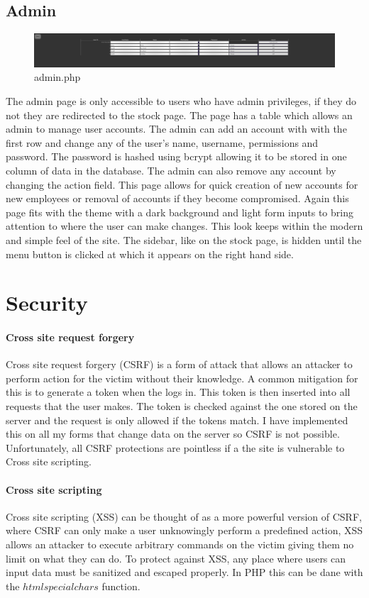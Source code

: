 \documentclass[12pt,a4paper]{report}
\begin{document}
	\subsection{Admin}
	\begin{figure}[!ht]
		\hspace*{-1in}
		\centering
		\includegraphics[width=170mm]{img/admin.png}
		\caption{admin.php \label{admin.php}}
	\end{figure}
	The admin page is only accessible to users who have admin privileges, if they do not they are redirected to the stock page. The page has a table which allows an admin to manage user accounts. The admin can add an account with with the first row and change any of the user's name, username, permissions and password. The password is hashed using bcrypt allowing it to be stored in one column of data in the database. The admin can also remove any account by changing the action field. This page allows for quick creation of new accounts for new employees or removal of accounts if they become compromised. Again this page fits with the theme with a dark background and light form inputs to bring attention to where the user can make changes. This look keeps within the modern and simple feel of the site. The sidebar, like on the stock page, is hidden until the menu button is clicked at which it appears on the right hand side.
	\newpage
	\section{Security}
	\paragraph{Cross site request forgery}
	Cross site request forgery (CSRF) is a form of attack that allows an attacker to perform action for the victim without their knowledge. A common mitigation for this is to generate a token when the logs in. This token is then inserted into all requests that the user makes. The token is checked against the one stored on the server and the request is only allowed if the tokens match. I have implemented this on all my forms that change data on the server so CSRF is not possible. Unfortunately, all CSRF protections are pointless if a the site is vulnerable to Cross site scripting.
	\paragraph{Cross site scripting}
	Cross site scripting (XSS) can be thought of as a more powerful version of CSRF, where CSRF can only make a user unknowingly perform a predefined action, XSS allows an attacker to execute arbitrary commands on the victim giving them no limit on what they can do. To protect against XSS, any place where users can input data must be sanitized and escaped properly. In PHP this can be dane with the $htmlspecialchars$ function.
\end{document}
